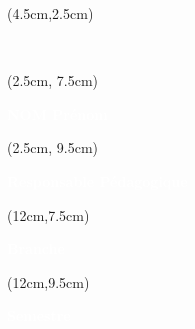 \begin{titlepage}
    \thispagestyle{empty}

    

    \begin{textblock*}{12cm}(4.5cm,2.5cm)
        \begin{LARGE}
            \makeatletter
            \justifying

            \begin{center}
                \textbf{\textcolor{white}{\jobposition}}
                \\
                \textbf{\textcolor{white}{\thetitle}}
            \end{center}

            \makeatother
        \end{LARGE}
    \end{textblock*}

    \begin{textblock*}{10cm}(2.5cm, 7.5cm)
        \raggedright
        \large
        \textbf{\textcolor{white}{NOM Prénom}}
        \\
        \textbf{\textcolor{white}{\theauthor}}
    \end{textblock*}

    \begin{textblock*}{10cm}(2.5cm, 9.5cm)
        \raggedright
        \large
        \textbf{\textcolor{white}{Responsable Pédagogique}}
        \\
        \textbf{\textcolor{white}{\theRPeda}}
    \end{textblock*}


    \begin{textblock*}{10cm}(12cm,7.5cm)
        \raggedright
        \large
        \textbf{\textcolor{white}{Branche}}
        \\
        \begin{raggedleft}
            \textcolor{white}{\theUE}
        \end{raggedleft}
    \end{textblock*}

    \begin{textblock*}{10cm}(12cm,9.5cm)
        \large
        \raggedright
        \textbf{\textcolor{white}{Semestre}}
        \\
        \textcolor{white}{\theSemestre}
    \end{textblock*}


\end{titlepage}
